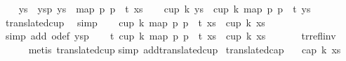 \begin{isabellebody}
%
\isadelimproof
%
\endisadelimproof
%
\isatagproof
{}\isamarkupfalse%
\isanewline
\ \ \isamarkupfalse%
\ ys\ \ ysp{\isacharcolon}{\kern0pt}\ {\isachardoublequoteopen}ys\ {\isasymequiv}\ map\ {\isacharparenleft}{\kern0pt}{\isasymlambda}p{\isachardot}{\kern0pt}\ p\ {\isacharminus}{\kern0pt}\ t{\isacharparenright}{\kern0pt}\ xs{\isachardoublequoteclose}\isanewline
\ \ \isamarkupfalse%
\ {\isachardoublequoteopen}cup\ k\ ys\ {\isasymLongrightarrow}\ cup\ k\ {\isacharparenleft}{\kern0pt}map\ {\isacharparenleft}{\kern0pt}{\isasymlambda}p{\isachardot}{\kern0pt}\ p\ {\isacharplus}{\kern0pt}\ t{\isacharparenright}{\kern0pt}\ ys{\isacharparenright}{\kern0pt}{\isachardoublequoteclose}\ \isamarkupfalse%
\ translated{\isacharunderscore}{\kern0pt}cup\ \isamarkupfalse%
\ simp\isanewline
\ \ \isamarkupfalse%
\ {\isachardoublequoteopen}cup\ k\ {\isacharparenleft}{\kern0pt}map\ {\isacharparenleft}{\kern0pt}{\isasymlambda}p{\isachardot}{\kern0pt}\ p\ {\isacharminus}{\kern0pt}\ t{\isacharparenright}{\kern0pt}\ xs{\isacharparenright}{\kern0pt}\ {\isasymLongrightarrow}\ cup\ k\ xs{\isachardoublequoteclose}\isanewline
\ \ \ \ \isamarkupfalse%
\ {\isacharparenleft}{\kern0pt}simp\ add{\isacharcolon}{\kern0pt}\ o{\isacharunderscore}{\kern0pt}def\ ysp{\isacharparenright}{\kern0pt}\isanewline
\ \ \isamarkupfalse%
\ {\isachardoublequoteopen}{\isasymAnd}t{\isachardot}{\kern0pt}\ cup\ k\ {\isacharparenleft}{\kern0pt}map\ {\isacharparenleft}{\kern0pt}{\isasymlambda}p{\isachardot}{\kern0pt}\ p\ {\isacharplus}{\kern0pt}\ t{\isacharparenright}{\kern0pt}\ xs{\isacharparenright}{\kern0pt}\ {\isasymLongrightarrow}\ cup\ k\ xs{\isachardoublequoteclose}\ \isanewline
\ \ \ \ \isamarkupfalse%
\ tr{\isacharunderscore}{\kern0pt}refl{\isacharunderscore}{\kern0pt}inv\isanewline
\ \ \ \ \isamarkupfalse%
\ {\isacharparenleft}{\kern0pt}metis\ translated{\isacharunderscore}{\kern0pt}cup{\isacharparenright}{\kern0pt}\isanewline
{}\isamarkupfalse%
{\isacharparenleft}{\kern0pt}simp\ add{\isacharcolon}{\kern0pt}translated{\isacharunderscore}{\kern0pt}cup{\isacharparenright}{\kern0pt}%
\endisatagproof
{\isafoldproof}%
%
\isadelimproof
\isanewline
%
\endisadelimproof
\isanewline
{}\isamarkupfalse%
\ translated{\isacharunderscore}{\kern0pt}cap{\isacharcolon}{\kern0pt}\isanewline
\ \ \ {\isachardoublequoteopen}cap\ k\ xs{\isachardoublequoteclose}\isanewline

\end{isabellebody}
